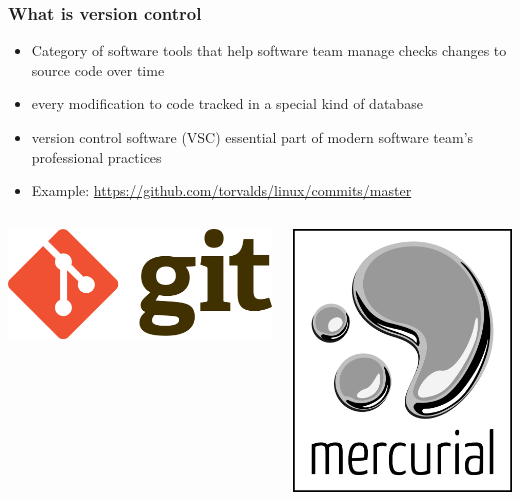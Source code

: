 \documentclass[12pt]{beamer}
\begin{document}
\begin{frame}
\frametitle{What is version control}
\begin{itemize}
	\item Category of software tools that help software team manage checks changes to source code over time
	\item every modification to code tracked in a special kind of database
	\item version control software (VSC) essential part of modern software team's professional practices
	\item Example: \url{https://github.com/torvalds/linux/commits/master}
\end{itemize}

\begin{columns}
	\begin{column}{0.33\linewidth}
		\includegraphics[width=0.8\linewidth]{git_logo}
	\end{column}
	\begin{column}{0.33\linewidth}
		\includegraphics[width=0.8\linewidth]{mercurial_logo}

\end{column}
\end{columns}
\end{frame}
\end{document}
